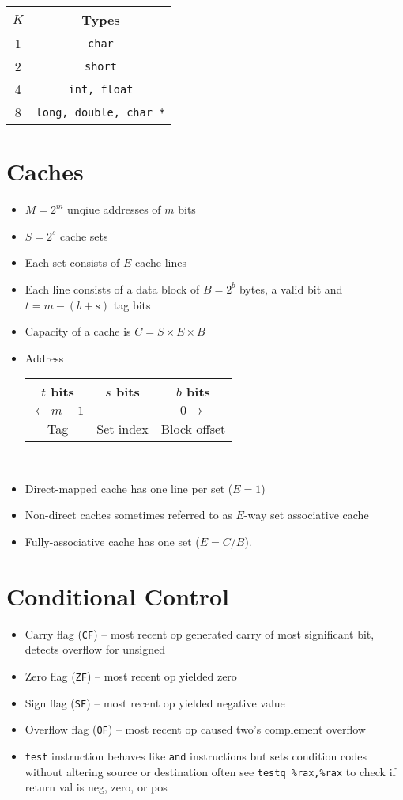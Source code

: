 \documentclass[twocolumn]{article}
\renewcommand{\tt}[1]{\texttt{#1}}
\begin{document}
\begin{tabular}{| c || c |} \hline
    $K$ & Types \\ \hline
    1 & \tt{char} \\ \hline
    2 & \tt{short} \\ \hline
    4 & \tt{int, float} \\ \hline
    8 & \tt{long, double, char *} \\ \hline
\end{tabular}

\vfill

\section{Caches}
\begin{itemize}[noitemsep]
    \item $M = 2^m$ unqiue addresses of $m$ bits
    \item $S = 2^s$ cache sets
    \item Each set consists of $E$ cache lines
    \item Each line consists of a data block of $B = 2^b$ bytes, a valid bit and $t = m - (b + s)$ tag bits 
    \item Capacity of a cache is $C = S \times E \times B$
    \item Address \\
    
    \begin{tabular}{| c | c | c |}
        $t$ bits & $s$ bits & $b$ bits \\ \hline
        $\leftarrow m - 1$ && $0 \rightarrow$ \\ \hline
        Tag & Set index & Block offset
    \end{tabular} \\
    \item Direct-mapped cache has one line per set ($E = 1$)
    \item Non-direct caches sometimes referred to as $E$-way set associative cache
    \item Fully-associative cache has one set ($E = C/B$).
\end{itemize}

\section{Conditional Control}
\begin{itemize}[noitemsep]
    \item Carry flag (\tt{CF}) -- most recent op generated carry of most significant bit, detects overflow for unsigned
    \item Zero flag (\tt{ZF}) -- most recent op yielded zero
    \item Sign flag (\tt{SF}) -- most recent op yielded negative value
    \item Overflow flag (\tt{OF}) -- most recent op caused two's complement overflow
    \item \tt{test} instruction behaves like \tt{and} instructions but sets condition codes without altering source or destination often see \tt{testq \%rax,\%rax} to check if return val is neg, zero, or pos
\end{itemize}
\end{document}
